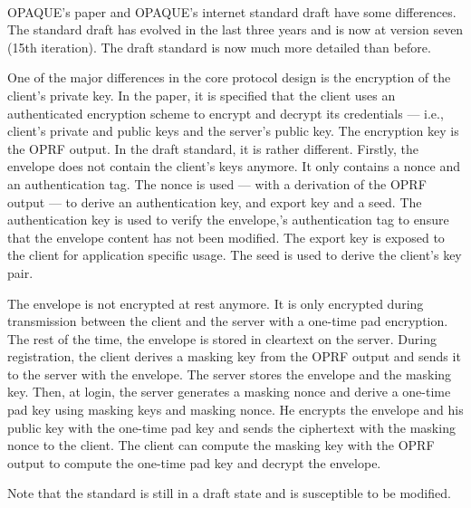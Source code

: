 ﻿\documentclass[../report.tex]{subfiles}
\begin{document}
\paragraph{} \label{sec:opaque_paper_vs_draft}
OPAQUE's paper \cite{OPAQUE_Paper} and OPAQUE's internet standard draft \cite{OPAQUE_Standard_Draft} have some differences. The standard draft has evolved in the last three years and is now at version seven (15th iteration).
The draft standard is now much more detailed than before.

One of the major differences in the core protocol design is the encryption of the client's private key.
In the paper, it is specified that the client uses an authenticated encryption scheme to encrypt and decrypt its credentials --- i.e., client's private and public keys and the server's public key. The encryption key is the OPRF output.
In the draft standard, it is rather different.
Firstly, the envelope does not contain the client's keys anymore. It only contains a nonce and an authentication tag. 
The nonce is used --- with a derivation of the OPRF output --- to derive an authentication key, and export key and a seed.
The authentication key is used to verify the envelope,'s authentication tag to ensure that the envelope content has not been modified.
The export key is exposed to the client for application specific usage.
The seed is used to derive the client's key pair.

The envelope is not encrypted at rest anymore. It is only encrypted during transmission between the client and the server with a one-time pad encryption. The rest of the time, the envelope is stored in cleartext on the server.
During registration, the client derives a masking key from the OPRF output and sends it to the server with the envelope. The server stores the envelope and the masking key.
Then, at login, the server generates a masking nonce and derive a one-time pad key using masking keys and masking nonce. He encrypts the envelope and his public key with the one-time pad key and sends the ciphertext with the masking nonce to the client.
The client can compute the masking key with the OPRF output to compute the one-time pad key and decrypt the envelope.


Note that the standard is still in a draft state and is susceptible to be modified.



\subsection{}
\end{document}
